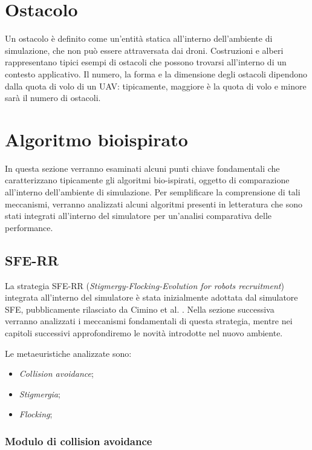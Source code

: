 \section{Ostacolo}

Un ostacolo è definito come un'entità statica all'interno dell'ambiente di simulazione, che non può essere attraversata dai droni.
Costruzioni e alberi rappresentano tipici esempi di ostacoli che possono trovarsi all'interno di un contesto applicativo.
Il numero, la forma e la dimensione degli ostacoli dipendono dalla quota di volo di un UAV: tipicamente, maggiore è la quota di volo e minore sarà il numero di ostacoli.

\section{Algoritmo bioispirato}

In questa sezione verranno esaminati alcuni punti chiave fondamentali che caratterizzano tipicamente gli algoritmi bio-ispirati, oggetto di comparazione all'interno dell'ambiente di simulazione.
Per semplificare la comprensione di tali meccanismi, verranno analizzati alcuni algoritmi presenti in letteratura che sono stati integrati all'interno del simulatore per un'analisi comparativa delle performance. 

\subsection{SFE-RR}

La strategia SFE-RR (\textit{Stigmergy-Flocking-Evolution for robots recruitment}) integrata all'interno del simulatore è stata inizialmente adottata dal simulatore SFE, pubblicamente rilasciato da Cimino et al. \cite{cimino2019adaptive}.
Nella sezione successiva verranno analizzati i meccanismi fondamentali di questa strategia, mentre nei capitoli successivi approfondiremo le novità introdotte nel nuovo ambiente.

Le metaeuristiche analizzate sono:

\begin{itemize}
    \item \textit{Collision avoidance};
    \item \textit{Stigmergia};
    \item \textit{Flocking};
\end{itemize}

\subsubsection{Modulo di collision avoidance}

